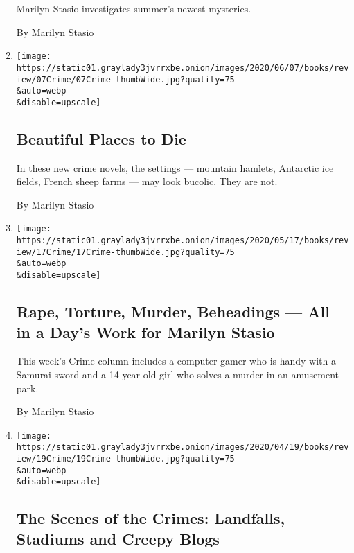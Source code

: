 \begin{enumerate}
  Marilyn Stasio investigates summer's newest mysteries.

  By Marilyn Stasio
\item
  \href{/2020/06/05/books/review/crime-fiction-michael-connelly.html}{}

  \texttt{[image: https://static01.graylady3jvrrxbe.onion/images/2020/06/07/books/review/07Crime/07Crime-thumbWide.jpg?quality=75\\\&auto=webp\\\&disable=upscale]}

  \hypertarget{beautiful-places-to-die}{%
  \subsection{Beautiful Places to Die}\label{beautiful-places-to-die}}

  In these new crime novels, the settings --- mountain hamlets,
  Antarctic ice fields, French sheep farms --- may look bucolic. They
  are not.

  By Marilyn Stasio
\item
  \href{/2020/05/15/books/review/crime-fiction-victim-2117-jussi-adler-olsen.html}{}

  \texttt{[image: https://static01.graylady3jvrrxbe.onion/images/2020/05/17/books/review/17Crime/17Crime-thumbWide.jpg?quality=75\\\&auto=webp\\\&disable=upscale]}

  \hypertarget{rape-torture-murder-beheadings--all-in-a-days-work-for-marilyn-stasio}{%
  \subsection{Rape, Torture, Murder, Beheadings --- All in a Day's Work
  for Marilyn
  Stasio}\label{rape-torture-murder-beheadings--all-in-a-days-work-for-marilyn-stasio}}

  This week's Crime column includes a computer gamer who is handy with a
  Samurai sword and a 14-year-old girl who solves a murder in an
  amusement park.

  By Marilyn Stasio
\item
  \href{/2020/04/17/books/review/crime-fiction-stasio-john-sandford.html}{}

  \texttt{[image: https://static01.graylady3jvrrxbe.onion/images/2020/04/19/books/review/19Crime/19Crime-thumbWide.jpg?quality=75\\\&auto=webp\\\&disable=upscale]}

  \hypertarget{the-scenes-of-the-crimes-landfalls-stadiums-and-creepy-blogs}{%
  \subsection{The Scenes of the Crimes: Landfalls, Stadiums and Creepy
  Blogs}\label{the-scenes-of-the-crimes-landfalls-stadiums-and-creepy-blogs}}


\end{enumerate}
